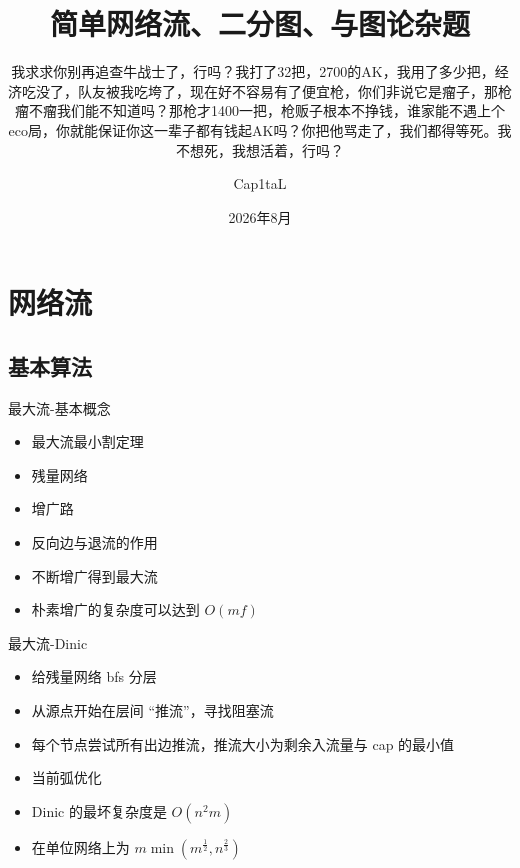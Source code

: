 ﻿\documentclass[aspectratio=169]{ctexbeamer}
\author{Cap1taL}
\title{简单网络流、二分图、与图论杂题}
\subtitle{我求求你别再追查牛战士了，行吗？我打了32把，2700的AK，我用了多少把，经济吃没了，队友被我吃垮了，现在好不容易有了便宜枪，你们非说它是瘤子，那枪瘤不瘤我们能不知道吗？那枪才1400一把，枪贩子根本不挣钱，谁家能不遇上个eco局，你就能保证你这一辈子都有钱起AK吗？你把他骂走了，我们都得等死。我不想死，我想活着，行吗？}
\date{2026年8月}
\begin{document}
\kaishu

\begin{frame}
    \titlepage
\end{frame}



\section{网络流}

\subsection{基本算法}
\begin{frame}{最大流-基本概念}
    \begin{itemize}
        \item 最大流最小割定理
        \item 残量网络
        \item 增广路
        \item 反向边与退流的作用
        \item 不断增广得到最大流
        \item 朴素增广的复杂度可以达到 $O(mf)$
    \end{itemize}
\end{frame}

\begin{frame}{最大流-Dinic}
    \begin{itemize}
        \item 给残量网络 bfs 分层
        \item 从源点开始在层间 “推流”，寻找阻塞流
        \item 每个节点尝试所有出边推流，推流大小为剩余入流量与 cap 的最小值
        \item 当前弧优化
        \item Dinic 的最坏复杂度是 $O(n^2m)$
        \item 在单位网络上为 $m\min(m^{\frac{1}{2}},n^{\frac{2}{3}})$ 
    \end{itemize}
\end{frame}
\end{document}
